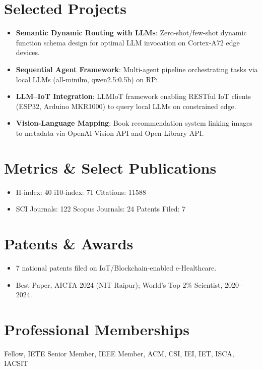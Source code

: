 \documentclass[10pt,a4paper]{article}
\begin{document}
	\section*{Selected Projects}
	\begin{itemize}
		\item \textbf{Semantic Dynamic Routing with LLMs}: Zero-shot/few-shot dynamic function schema design for optimal LLM invocation on Cortex‑A72 edge devices.
		\item \textbf{Sequential Agent Framework}: Multi-agent pipeline orchestrating tasks via local LLMs (all-minilm, qwen2.5:0.5b) on RPi.
		\item \textbf{LLM–IoT Integration}: LLMIoT framework enabling RESTful IoT clients (ESP32, Arduino MKR1000) to query local LLMs on constrained edge.
		\item \textbf{Vision-Language Mapping}: Book recommendation system linking images to metadata via OpenAI Vision API and Open Library API.
	\end{itemize}
	
	\section*{Metrics \& Select Publications}
	\begin{itemize}
		\item H-index: 40 \; i10-index: 71 \; Citations: 11588	
		\item SCI Journals: 122 \; Scopus Journals: 24 \; Patents Filed: 7
	\end{itemize}

	
	\section*{Patents \& Awards}
	\begin{itemize}
		\item 7 national patents filed on IoT/Blockchain-enabled e-Healthcare.
		\item Best Paper, AICTA 2024 (NIT Raipur); World's Top 2\% Scientist, 2020--2024.
	\end{itemize}
	
	\section*{Professional Memberships}
	Fellow, IETE \; Senior Member, IEEE \; Member, ACM, CSI, IEI, IET, ISCA, IACSIT
	

	
\end{document}
